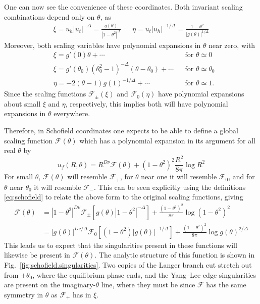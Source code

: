 \documentclass[
aps,
pre,
preprint,
longbibliography,
floatfix
]{revtex4-2}
\begin{document}
One can now see the convenience of these coordinates. Both invariant scaling
combinations depend only on $\theta$, as
\begin{align}
  \xi=u_h|u_t|^{-\Delta}=\frac{g(\theta)}{|1-\theta^2|^{\Delta}} &&
  \eta=u_t|u_h|^{-1/\Delta}=\frac{1-\theta^2}{|g(\theta)|^{1/\Delta}}
\end{align}
Moreover, both scaling variables have polynomial expansions in $\theta$ near zero, with
\begin{align}
  &\xi= g'(0)\theta+\cdots  && \text{for $\theta\simeq0$}\\
  &\xi=g'(\theta_0)(\theta_0^2-1)^{-\Delta}(\theta-\theta_0)+\cdots && \text{for $\theta\simeq\theta_0$}
  \\
  &\eta=-2(\theta-1)g(1)^{-1/\Delta}+\cdots && \text{for $\theta\simeq1$}.
\end{align}
Since the scaling functions $\mathcal F_\pm(\xi)$ and $\mathcal F_0(\eta)$ have
polynomial expansions about small $\xi$ and $\eta$, respectively, this implies
both will have polynomial expansions in $\theta$ everywhere.

Therefore, in Schofield coordinates one expects to be able to define a global
scaling function $\mathcal F(\theta)$ which has a polynomial expansion in its
argument for all real $\theta$ by
\begin{equation}
  u_f(R,\theta)=R^{D\nu}\mathcal F(\theta)+(1-\theta^2)^2\frac{R^2}{8\pi}\log R^2
\end{equation}
For small $\theta$, $\mathcal F(\theta)$ will
resemble $\mathcal F_+$, for $\theta$ near one it will resemble $\mathcal F_0$,
and for $\theta$ near $\theta_0$ it will resemble $\mathcal F_-$. This can be
seen explicitly using the definitions \eqref{eq:schofield} to relate the above
form to the original scaling functions, giving
\begin{equation} \label{eq:scaling.function.equivalences.2d}
  \begin{aligned}
    \mathcal F(\theta)
    &=|1-\theta^2|^{D\nu}\mathcal F_\pm\left[g(\theta)|1-\theta^2|^{-\Delta}\right]
    +\frac{(1-\theta^2)^2}{8\pi}\log(1-\theta^2)^2\\
    &=|g(\theta)|^{D\nu/\Delta}\mathcal F_0\left[(1-\theta^2)|g(\theta)|^{-1/\Delta}\right]
    +\frac{(1-\theta^2)^2}{8\pi}\log g(\theta)^{2/\Delta}
  \end{aligned}
\end{equation}
This leads us
to expect that the singularities present in these functions will likewise be
present in $\mathcal F(\theta)$. The analytic structure of this function is
shown in Fig.~\ref{fig:schofield.singularities}. Two copies of the Langer
branch cut stretch out from $\pm\theta_0$, where the equilibrium phase ends,
and the Yang--Lee edge singularities are present on the imaginary-$\theta$
line, where they must be since $\mathcal F$ has the same symmetry in $\theta$
as $\mathcal F_+$ has in $\xi$.
\end{document}
